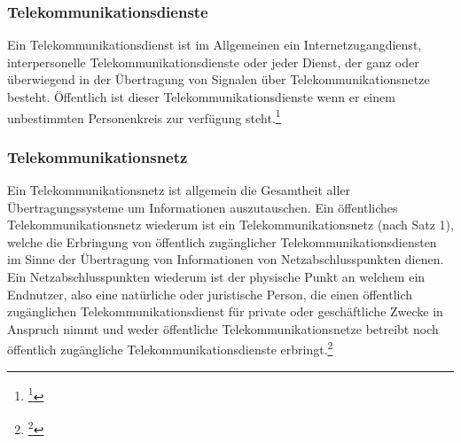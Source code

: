 \documentclass[11pt,a4paper,hidelinks]{article}   %
\begin{document}
            \subsubsection{Telekommunikationsdienste}
            Ein Telekommunikationsdienst ist im Allgemeinen ein Internetzugangdienst, interpersonelle Telekommunikationsdienste oder jeder Dienst, der ganz oder überwiegend in der Übertragung von Signalen über Telekommunikationsnetze besteht. Öffentlich ist dieser Telekommunikationsdienste wenn er einem unbestimmten Personenkreis zur verfügung steht.\footnote{
                \footcite[Vgl.][, §3 Nummer 60]{TKG}
            }

            \subsubsection{Telekommunikationsnetz}
            Ein Telekommunikationsnetz ist allgemein die Gesamtheit aller Übertragungssysteme um Informationen auszutauschen. Ein öffentliches Telekommunikationsnetz wiederum ist ein Telekommunikationsnetz (nach Satz 1), welche die Erbringung von öffentlich zugänglicher Telekommunikationsdiensten im Sinne der Übertragung von Informationen von Netzabschlusspunkten dienen. Ein Netzabschlusspunkten wiederum ist der physische Punkt an welchem ein Endnutzer, also eine natürliche oder juristische Person, die einen öffentlich zugänglichen Telekommunikationsdienst für private oder geschäftliche Zwecke in Anspruch nimmt und weder öffentliche Telekommunikationsnetze betreibt noch öffentlich zugängliche Telekommunikationsdienste erbringt.\footnote{
                \footcite[Vgl.][,  §3 Nummer 13, 32, 41, 42, 61 \& 65]{TKG}
            }
\end{document}
